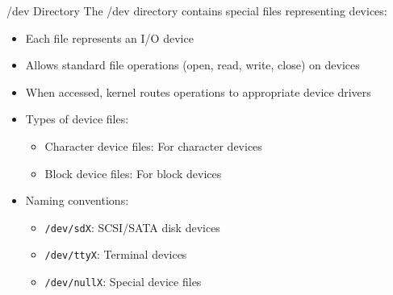 \multend

\begin{definition}{/dev Directory}
    The /dev directory contains special files representing devices:
    \begin{itemize}
        \item Each file represents an I/O device
        \item Allows standard file operations (open, read, write, close) on devices
        \item When accessed, kernel routes operations to appropriate device drivers
        \item Types of device files:
            \begin{itemize}
                \item Character device files: For character devices
                \item Block device files: For block devices
            \end{itemize}
        \item Naming conventions:
            \begin{itemize}
                \item \texttt{/dev/sdX}: SCSI/SATA disk devices
                \item \texttt{/dev/ttyX}: Terminal devices
                \item \texttt{/dev/nullX}: Special device files
            \end{itemize}
    \end{itemize}
\end{definition}





